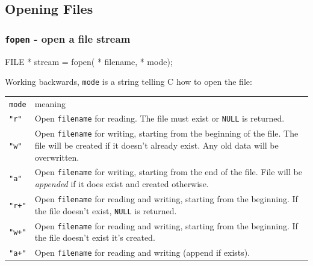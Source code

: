 \documentclass[smaller,table]{beamer}
\begin{document}
\subsection{Opening Files}
\begin{frame}
\frametitle{{\tt fopen} - open a file stream}
\begin{semiverbatim}
\small
FILE * stream = fopen( * filename,  * mode);
\end{semiverbatim}

Working backwards, {\tt mode} is a string telling C how to open the file:
{\footnotesize
\begin{center}
\begin{tabular}{l p{250pt}}
\tt mode& meaning\\
\tt "r"& Open {\tt filename} for reading. The file must exist or {\tt NULL} is returned.\\
\tt "w"& Open {\tt filename} for writing, starting from the beginning of the file. The file will be created if it doesn't already exist. Any old data will be overwritten.\\
\tt "a"& Open {\tt filename} for writing, starting from the end of the file. File will be \emph{appended} if it does exist and created otherwise.\\
\tt "r+"& Open {\tt filename} for reading and writing, starting from the beginning. If the file doesn't exist, {\tt NULL} is returned.\\
\tt "w+"& Open {\tt filename} for reading and writing, starting from the beginning. If the file doesn't exist it's created.\\
\tt "a+"& Open {\tt filename} for reading and writing (append if exists).
\end{tabular}
\end{center}}
\end{frame}
\end{document}
